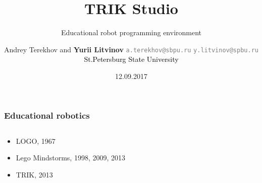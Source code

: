 \documentclass[xetex,mathserif,serif]{beamer}
\title{TRIK Studio}
\subtitle{Educational robot programming environment}
\author[Yurii Litvinov]{Andrey Terekhov and \textbf{Yurii Litvinov} \newline 
	\textcolor{gray}{\small\texttt{a.terekhov@sbpu.ru}} \newline 
	\textcolor{gray}{\small\texttt{y.litvinov@spbu.ru}} \newline 
	\textcolor{black}{\small{St.Petersburg State University}}
}
\date{12.09.2017}
\begin{document}
	
	\frame{\titlepage}
	
	\begin{frame}
		\frametitle{Educational robotics}
		\begin{columns}
			\begin{column}{0.5\textwidth}
				\begin{itemize}
					\item LOGO, 1967
					\item Lego Mindstorms, 1998, 2009, 2013
					\item TRIK, 2013
				\end{itemize}
			\end{column}
			\begin{column}{0.5\textwidth}
			\end{column}
		\end{columns}
		\vspace{0.7cm}
	\end{frame}
\end{document}

